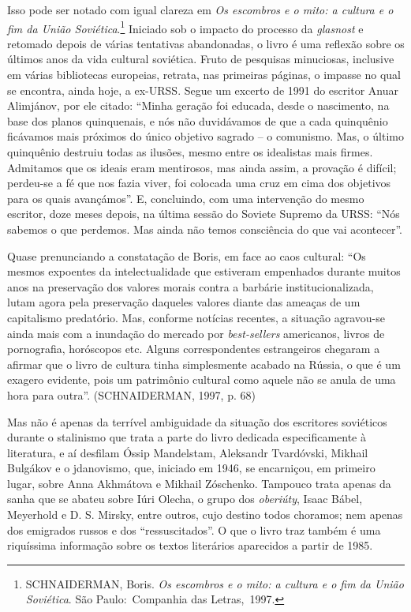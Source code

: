 Isso pode ser notado com igual clareza em \emph{Os escombros e o mito: a
cultura e o fim da União Soviética}.\footnote{SCHNAIDERMAN, Boris.
  \emph{Os escombros e o mito: a cultura e o fim da União Soviética}.
  São Paulo:~Companhia das Letras,~1997.} Iniciado sob o impacto do
processo da \emph{glasnost} e retomado depois de várias tentativas
abandonadas, o livro é uma reflexão sobre os últimos anos da vida
cultural soviética. Fruto de pesquisas minuciosas, inclusive em várias
bibliotecas europeias, retrata, nas primeiras páginas, o impasse no qual
se encontra, ainda hoje, a ex-URSS. Segue um excerto de 1991 do escritor
Anuar Alimjánov, por ele citado: ``Minha geração foi educada, desde o
nascimento, na base dos planos quinquenais, e nós não duvidávamos de que
a cada quinquênio ficávamos mais próximos do único objetivo sagrado -- o
comunismo. Mas, o último quinquênio destruiu todas as ilusões, mesmo
entre os idealistas mais firmes. Admitamos que os ideais eram
mentirosos, mas ainda assim, a provação é difícil; perdeu-se a fé que
nos fazia viver, foi colocada uma cruz em cima dos objetivos para os
quais avançámos''. E, concluindo, com uma intervenção do mesmo escritor,
doze meses depois, na última sessão do Soviete Supremo da URSS: ``Nós
sabemos o que perdemos. Mas ainda não temos consciência do que vai
acontecer''.

Quase prenunciando a constatação de Boris, em face ao caos cultural:
``Os mesmos expoentes da intelectualidade que estiveram empenhados
durante muitos anos na preservação dos valores morais contra a barbárie
institucionalizada, lutam agora pela preservação daqueles valores diante
das ameaças de um capitalismo predatório. Mas, conforme notícias
recentes, a situação agravou-se ainda mais com a inundação do mercado
por \emph{best-sellers} americanos, livros de pornografia, horóscopos
etc. Alguns correspondentes estrangeiros chegaram a afirmar que o livro
de cultura tinha simplesmente acabado na Rússia, o que é um exagero
evidente, pois um patrimônio cultural como aquele não se anula de uma
hora para outra''. (SCHNAIDERMAN, 1997, p. 68)

Mas não é apenas da terrível ambiguidade da situação dos escritores
soviéticos durante o stalinismo que trata a parte do livro dedicada
especificamente à literatura, e aí desfilam Óssip Mandelstam, Aleksandr
Tvardóvski, Mikhail Bulgákov e o jdanovismo, que, iniciado em 1946, se
encarniçou, em primeiro lugar, sobre Anna Akhmátova e Mikhail Zóschenko.
Tampouco trata apenas da sanha que se abateu sobre Iúri Olecha, o grupo
dos \emph{oberiúty}, Isaac Bábel, Meyerhold e D. S. Mirsky, entre
outros, cujo destino todos choramos; nem apenas dos emigrados russos e
dos ``ressuscitados''. O que o livro traz também é uma riquíssima
informação sobre os textos literários aparecidos a partir de 1985.


